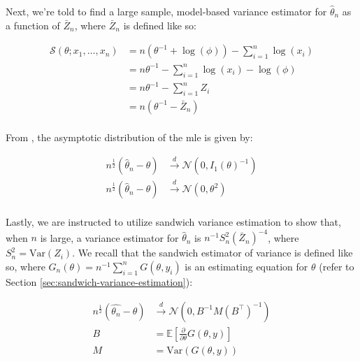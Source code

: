 \documentclass{report}
\begin{document}
Next, we're told to find a large sample, model-based variance estimator for $\hat{\theta}_n$ as a function of $\bar{Z}_n$, where $\bar{Z}_n$ is defined like so:

\begin{equation}\label{eq:ex-ols-pareto-zbar-definition}
    \begin{aligned}
        \mathcal{S}(\theta; x_1, \dots, x_n)
          &= n \left(\theta^{-1} + \log(\phi)\right) - \sum_{i=1}^n \log(x_i) \\
          &= n\theta^{-1} - \sum_{i=1}^n \log(x_i) - \log(\phi) \\
          &= n\theta^{-1} - \sum_{i=1}^n Z_i \\
          &= n\left(\theta^{-1} - \bar{Z}_n\right) \\
    \end{aligned}
\end{equation}

From \cite[Chapter~2.4.1]{wakefield_bayesian_2013}, the asymptotic distribution of the \gls{mle} is given by:

\begin{equation}\label{eq:ex-ols-pareto-mle-asymptotic-dist}
    \begin{aligned}
        n^{\frac{1}{2}} \left(\hat{\theta}_n - \theta\right) &\overset{d}{\to} \mathcal{N}\left(0, I_1(\theta)^{-1}\right) \\
        n^{\frac{1}{2}} \left(\hat{\theta}_n - \theta\right) &\overset{d}{\to} \mathcal{N}\left(0, \theta^2\right) \\
    \end{aligned}
\end{equation}

Lastly, we are instructed to utilize sandwich variance estimation to show that, when $n$ is large, a variance estimator for $\hat{\theta}_n$ is $n^{-1}S^2_n\left(\bar{Z}_n\right)^{-4}$, where $S^2_n = \text{Var}(Z_i)$. We recall that the sandwich estimator of variance is defined like so, where $G_n(\theta) = n^{-1} \sum_{i=1}^n G(\theta, y_i)$ is an estimating equation for $\theta$ (refer to Section \ref{sec:sandwich-variance-estimation}):

\begin{equation}\label{eq:ex-ols-pareto-sandwich-variance-estimator}
    \begin{aligned}
        n^{\frac{1}{2}}\left(\hat{\theta_n} - \theta\right) &\overset{d}{\to} \mathcal{N}\left(0, B^{-1} M \left(B^\intercal\right)^{-1}\right) \\
        B &= \mathbb{E}\left[\frac{\partial}{\partial\theta} G(\theta, y)\right] \\
        M &= \text{Var}(G(\theta, y)) \\
    \end{aligned}
\end{equation}
\end{document}

